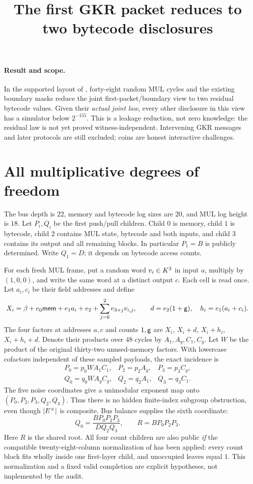 \documentclass[11pt]{article}
\title{The first GKR packet reduces to two bytecode disclosures}
\author{}
\date{}
\begin{document}
\maketitle
\vspace{-2em}

\paragraph{Result and scope.} In the supported layout of , forty-eight random MUL cycles and the existing boundary masks reduce the joint first-packet/boundary view to two residual bytecode values. Given their \emph{actual joint law}, every other disclosure in this view has a simulator below $2^{-155}$. This is a leakage reduction, not zero knowledge: the residual law is not yet proved witness-independent. Intervening GKR messages and later protocols are still excluded; coins are honest interactive challenges.

\section{All multiplicative degrees of freedom}

The bus depth is $22$, memory and bytecode log sizes are $20$, and MUL log height is $18$. Let $P_i,Q_i$ be the first push/pull children. Child $0$ is memory, child $1$ is bytecode, child $2$ contains MUL state, bytecode and both inputs, and child $3$ contains its output and all remaining blocks. In particular $P_1=B$ is publicly determined. Write $Q_1=D$; it depends on bytecode access counts.

For each fresh MUL frame, put a random word $v_i\in K^3$ in input $a$, multiply by $(1,0,0)$, and write the same word at a distinct output $c$. Each cell is read once. Let $a_i,c_i$ be their field addresses and define
\[
 X_i=\beta+e_0\mathsf{mem}+e_1a_i+e_2+\sum_{j=0}^2e_{3+j}v_{i,j},
 \qquad d=e_2(1+\mathsf{g}),\quad h_i=e_1(a_i+c_i).
\]
The four factors at addresses $a,c$ and counts $1,\mathsf{g}$ are $X_i$, $X_i+d$, $X_i+h_i$, $X_i+h_i+d$. Denote their products over $48$ cycles by $A_1,A_g,C_1,C_g$. Let $W$ be the product of the original thirty-two unused-memory factors. With lowercase cofactors independent of these sampled payloads, the exact incidence is
\[
\begin{array}{lll}
 P_0=p_0WA_1C_1,&P_2=p_2A_g,&P_3=p_3C_g,\\
 Q_0=q_0WA_gC_g,&Q_2=q_2A_1,&Q_3=q_3C_1.
\end{array}
\]
The five noise coordinates give a unimodular exponent map onto $(P_0,P_2,P_3,Q_2,Q_3)$. Thus there is no hidden finite-index subgroup obstruction, even though $|E^\times|$ is composite. Bus balance supplies the sixth coordinate:
\[
 Q_0=\frac{BP_0P_2P_3}{DQ_2Q_3},\qquad
 R=BP_0P_2P_3.
\]
Here $R$ is the shared root. All four count children are also public \emph{if} the compatible twenty-eight-column normalization of  has been applied: every count block fits wholly inside one first-layer child, and unoccupied leaves equal $1$. This normalization and a fixed valid completion are explicit hypotheses, not implemented by the audit.
\end{document}

